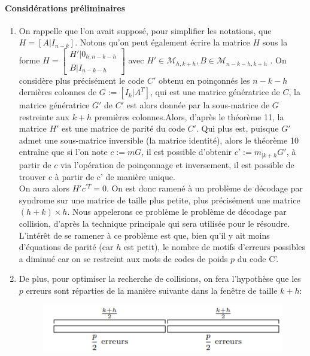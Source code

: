 \documentclass[12pt,openany]{report}
\begin{document}
\paragraph{Considérations préliminaires }
\begin{enumerate}
\item On rappelle que l'on avait supposé, pour simplifier les notations, que $H=\left[ A | I_{n-k} \right]   $. Notons qu'on peut également écrire la matrice $ H  $ sous la forme 
$ H=\begin{bmatrix}
H'  |0_{h,n-k-h}\\
B   |I_{n-k-h}
\end{bmatrix}  $ avec $ H' \in \mathcal{M}_{h,k+h},B \in \mathcal{M}_{n-k-h,k+h}  $ . On considère plus précisément le code $\mathit{C'} $ obtenu en poinçonnés les $n-k-h  $ dernières colonnes de $G:=\left[ I_k | A^T \right]   $, qui est une matrice génératrice de $\mathit{C} $, la matrice génératrice $G' $ de $C' $ est alors donnée par la sous-matrice de $ G$ restreinte aux $k+h$ premières colonnes.Alors, d'après le théorème 11, la matrice $H' $ est une matrice de parité du code $ C' $. Qui plus est, puisque $G' $ admet une sous-matrice
inversible (la matrice identité), alors le théorème 10 entraîne que si l’on note $c:=mG  $, il est possible d'obtenir $c':=m_{|k+h} G' $, à partir de $c$ via l’opération de poinçonnage et inversement, il est possible de trouver c à
partir de c' de manière unique.\\
 On aura alors $ H'c^{'T}=0  $. On est donc ramené à un problème de décodage
par syndrome sur une matrice de taille plus petite, plus précisément une
matrice $(h+k)\times h $. Nous appelerons ce problème le problème de décodage par collision, d’après la technique principale qui sera utilisée pour le
résoudre. L’intérêt de se ramener à ce problème est que, bien qu’il y ait moins d’équations de parité (car $h$ est petit), le nombre de motifs d’erreurs possibles a diminué car on se restreint aux mots de codes de
poids $p$ du code C'.
\item De plus, pour optimiser la recherche de collisions, on fera l’hypothèse que les $p$ erreurs sont réparties de la manière  suivante dans la fenêtre de taille $k+h $:
\begin{figure}[htp]
\centering

\includegraphics[scale=1.2]{./collision}



\end{figure}
\end{enumerate}
\end{document}
